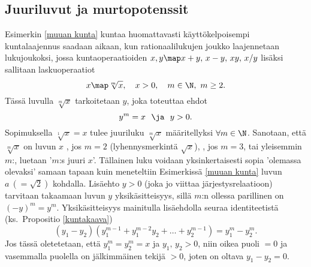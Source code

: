 \subsection{Juuriluvut ja murtopotenssit}

Esimerkin \ref{muuan kunta} kuntaa huomattavasti käyttökelpoisempi kuntalaajennus saadaan
aikaan, kun rationaalilukujen joukko laajennetaan lukujoukoksi, jossa kuntaoperaatioiden
$x,y \map x+y,\,x-y,\,xy,\,x/y$ lisäksi sallitaan laskuoperaatiot
\[
x \map \sqrt[m]{x}, \quad x>0, \quad m\in\N,\ m \ge 2.
\]
%
Tässä luvulla $\sqrt[m]{x}$ tarkoitetaan  $y$, joka toteuttaa ehdot
\[
y^m = x\ \ \ja\ \ y>0.
\]
Sopimuksella $\sqrt[1]{x}=x$ tulee juuriluku $\sqrt[m]{x}$ määritellyksi $\forall m\in\N$.
Sanotaan, että $\sqrt[m]{x}$ on luvun $x$ , jos $m=2$
(lyhennysmerkintä $\sqrt{x}$), , jos $m=3$, tai  yleisemmin $m$:,
luetaan '$m$:s juuri $x$'. Tällainen luku voidaan yksinkertaisesti sopia 'olemassa olevaksi'
samaan tapaan kuin meneteltiin Esimerkissä \ref{muuan kunta} luvun $a\ (=\sqrt{2})$ kohdalla.
Lisäehto $y>0$ (joka jo viittaa järjestysrelaatioon) tarvitaan takaamaan luvun $y$
yksikäsitteisyys, sillä $m$:n ollessa parillinen on $(-y)^m=y^m$. Yksikäsitteisyys mainitulla
lisäehdolla seuraa identiteetistä (ks.\ Propositio \ref{kuntakaava})
\[
(y_1-y_2)(y_1^{m-1}+y_1^{m-2}y_2+ \ldots + y_2^{m-1}) = y_1^m-y_2^m.
\]
Jos tässä oletetetaan, että $y_1^m=y_2^m=x$ ja $y_1,\,y_2>0$, niin oikea puoli $=0$ ja vasemmalla
puolella on jälkimmäinen tekijä $>0$, joten on oltava $y_1-y_2=0$.  

